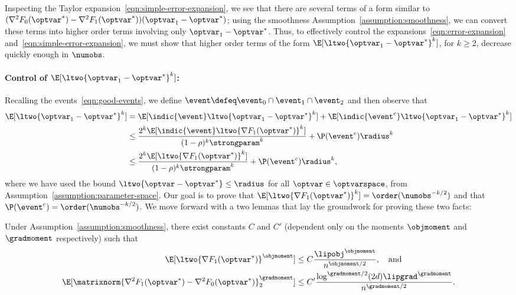 \documentclass[11pt,twoside]{article}
\theoremstyle{definition}
\begin{document}
Inspecting the Taylor expansion~\eqref{eqn:simple-error-expansion}, we
see that there are several terms of a form similar to $(\nabla^2
F_0(\optvar^*) - \nabla^2 F_1(\optvar^*))(\optvar_1 - \optvar^*)$;
using the smoothness Assumption~\ref{assumption:smoothness}, we can
convert these terms into higher order terms involving only $\optvar_1
- \optvar^*$. Thus, to effectively control the
expansions~\eqref{eqn:error-expansion}
and~\eqref{eqn:simple-error-expansion}, we must show that higher order
terms of the form $\E[\ltwo{\optvar_1 - \optvar^*}^k]$, for $k \geq
2$, decrease quickly enough in $\numobs$.


\paragraph{Control of $\E[\ltwo{\optvar_1 - \optvar^*}^k]$:}
Recalling the events~\eqref{eqn:good-events}, we define $\event \defeq
\event_0 \cap \event_1 \cap \event_2$ and then observe that
\begin{align*}
  \E[\ltwo{\optvar_1 - \optvar^*}^k]
  & = \E[\indic{\event} \ltwo{\optvar_1 - \optvar^*}^k]
  + \E[\indic{\event^c} \ltwo{\optvar_1 - \optvar^*}^k] \\
  & \le \frac{2^k \E[\indic{\event} \ltwo{\nabla F_1(\optvar^*)}^k]}{
    (1 - \rho)^k \strongparam^k}
  + \P(\event^c) \radius^k \\
  & \le \frac{2^k \E[\ltwo{\nabla F_1(\optvar^*)}^k]}{(1 - \rho)^k
    \strongparam^k} + \P(\event^c) \radius^k,
\end{align*}
where we have used the bound $\ltwo{\optvar - \optvar^*} \le \radius$
for all $\optvar \in \optvarspace$, from
Assumption~\ref{assumption:parameter-space}.  Our goal is to prove
that $\E[\ltwo{\nabla F_1(\optvar^*)}^k] = \order(\numobs^{-k/2})$ and
that $\P(\event^c) = \order(\numobs^{-k/2})$.  We move forward with a
two lemmas that lay the groundwork for proving these two facts:
\begin{lemma}
  \label{lemma:moment-consequences}
  Under Assumption~\ref{assumption:smoothness}, there exist constants $C$
  and $C'$ (dependent only on the moments $\objmoment$ and $\gradmoment$
  respectively) such that
  \begin{subequations}
    \begin{align}
      \E[\ltwo{\nabla F_1(\optvar^*)}^\objmoment] & \le
      C \frac{\lipobj^\objmoment}{n^{\objmoment / 2}},
      ~~~ \mbox{and}
      \label{eqn:grad-bound} \\
      \E[\matrixnorm{\nabla^2 F_1(\optvar^*)
          - \nabla^2 F_0(\optvar^*)}_2^\gradmoment]
      & \le C' \frac{\log^{\gradmoment / 2}(2d) \lipgrad^\gradmoment}{
        n^{\gradmoment/2}}.
      \label{eqn:hessian-bound}
    \end{align}
  \end{subequations}
\end{lemma}
\noindent
\end{document}
